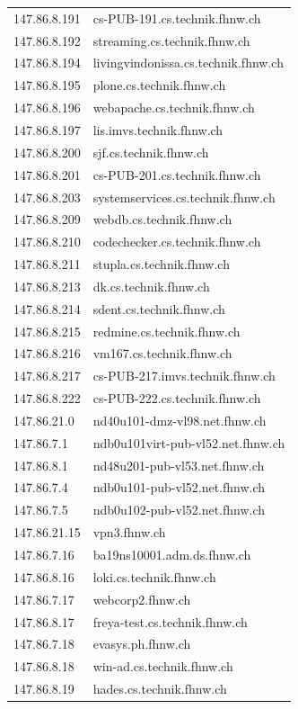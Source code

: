 \documentclass[11pt,a4paper]{scrartcl}
\begin{document}
\begin{longtable}{p{2.5cm}|p{7cm}}
	147.86.8.191 & cs-PUB-191.cs.technik.fhnw.ch \\
	147.86.8.192 & streaming.cs.technik.fhnw.ch \\
	147.86.8.194 & livingvindonissa.cs.technik.fhnw.ch \\
	147.86.8.195 & plone.cs.technik.fhnw.ch \\
	147.86.8.196 & webapache.cs.technik.fhnw.ch \\
	147.86.8.197 & lis.imvs.technik.fhnw.ch \\
	147.86.8.200 & sjf.cs.technik.fhnw.ch \\
	147.86.8.201 & cs-PUB-201.cs.technik.fhnw.ch \\
	147.86.8.203 & systemservices.cs.technik.fhnw.ch \\
	147.86.8.209 & webdb.cs.technik.fhnw.ch \\
	147.86.8.210 & codechecker.cs.technik.fhnw.ch \\
	147.86.8.211 & stupla.cs.technik.fhnw.ch \\
	147.86.8.213 & dk.cs.technik.fhnw.ch \\
	147.86.8.214 & sdent.cs.technik.fhnw.ch \\
	147.86.8.215 & redmine.cs.technik.fhnw.ch \\
	147.86.8.216 & vm167.cs.technik.fhnw.ch \\
	147.86.8.217 & cs-PUB-217.imvs.technik.fhnw.ch \\
	147.86.8.222 & cs-PUB-222.cs.technik.fhnw.ch \\
	147.86.21.0 & nd40u101-dmz-vl98.net.fhnw.ch \\
	147.86.7.1 & ndb0u101virt-pub-vl52.net.fhnw.ch \\
	147.86.8.1 & nd48u201-pub-vl53.net.fhnw.ch \\
	147.86.7.4 & ndb0u101-pub-vl52.net.fhnw.ch \\
	147.86.7.5 & ndb0u102-pub-vl52.net.fhnw.ch \\
	147.86.21.15 & vpn3.fhnw.ch \\
	147.86.7.16 & ba19ns10001.adm.ds.fhnw.ch \\
	147.86.8.16 & loki.cs.technik.fhnw.ch \\
	147.86.7.17 & webcorp2.fhnw.ch \\
	147.86.8.17 & freya-test.cs.technik.fhnw.ch \\
	147.86.7.18 & evasys.ph.fhnw.ch \\
	147.86.8.18 & win-ad.cs.technik.fhnw.ch \\
	147.86.8.19 & hades.cs.technik.fhnw.ch \\

\end{longtable}
\end{document}
